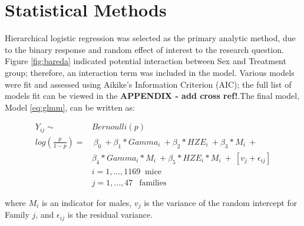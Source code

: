 \documentclass[12pt]{article}
\begin{document}
\section{Statistical Methods}
\label{sec:methods}

Hierarchical logistic regression was selected as the primary analytic method, due to the binary response and random effect of interest to the research question. Figure \ref{fig:bareda} indicated potential interaction between Sex and Treatment group; therefore, an interaction term was included in the model. Various models were fit and assessed using Aikike's Information Criterion (AIC); the full list of models fit can be viewed in the \textbf{APPENDIX - add cross ref!}.The final model, Model \eqref{eq:glmm}, can be written as:

\begin{equation}
\begin{aligned}
Y_{ij} \sim &Bernoulli(p) \\
log(\frac{p}{1-p}) = &\ \beta_0\ +\beta_1*Gamma_i\ + \beta_2*HZE_i\ + \beta_3*M_i\ + \\ &\beta_4*Gamma_i*M_i\ + \beta_5*HZE_i*M_i\ +\ [v_{j} + \epsilon_{ij}] \\
&i = 1, ..., 1169\ \mbox{ mice} \\
&j = 1,...,47\ \ \mbox{ families}
\end{aligned}
\label{eq:glmm}
\end{equation}

where \(M_i\) is an indicator for males, \(v_{j}\) is the variance of the random intercept for Family \(j\), and \(\epsilon_{ij}\) is the residual variance.
\end{document}
